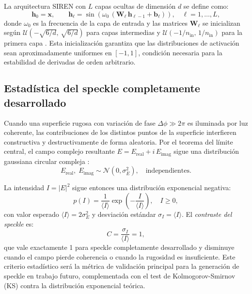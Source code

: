 La arquitectura SIREN con $L$ capas ocultas de dimensión $d$ se define como:
%
\begin{equation}
  \mathbf{h}_0 = \mathbf{x}, \qquad
  \mathbf{h}_\ell = \sin\!\left(\omega_0\,(\mathbf{W}_\ell\,\mathbf{h}_{\ell-1} + \mathbf{b}_\ell)\right),
  \quad \ell = 1, \ldots, L,
  \label{eq:siren}
\end{equation}
%
donde $\omega_0$ es la frecuencia de la capa de entrada y las matrices $\mathbf{W}_\ell$
se inicializan según $\mathcal{U}(-\sqrt{6/d},\,\sqrt{6/d})$ para capas intermedias
y $\mathcal{U}(-1/n_{\mathrm{in}},\,1/n_{\mathrm{in}})$ para la primera capa
\citep{Sitzmann2020_SIREN}.
Esta inicialización garantiza que las distribuciones de activación sean aproximadamente
uniformes en $[-1, 1]$, condición necesaria para la estabilidad de derivadas de orden
arbitrario.

\subsection{Estadística del speckle completamente desarrollado}
\label{subsec:speckle}

Cuando una superficie rugosa con variación de fase $\Delta\phi \gg 2\pi$ es iluminada
por luz coherente, las contribuciones de los distintos puntos de la superficie interfieren
constructiva y destructivamente de forma aleatoria.
Por el teorema del límite central, el campo complejo resultante
$E = E_{\mathrm{real}} + i\,E_{\mathrm{imag}}$ sigue una distribución gaussiana circular
compleja \citep{Goodman2007_Speckle}:
%
\begin{equation}
  E_{\mathrm{real}},\; E_{\mathrm{imag}} \sim \mathcal{N}(0, \sigma_E^2),
  \quad \text{independientes.}
  \label{eq:campo_gaussiano}
\end{equation}

La intensidad $I = |E|^2$ sigue entonces una distribución exponencial negativa:
%
\begin{equation}
  p(I) = \frac{1}{\langle I \rangle}\exp\!\left(-\frac{I}{\langle I \rangle}\right),
  \quad I \geq 0,
  \label{eq:pdf_intensidad}
\end{equation}
%
con valor esperado $\langle I \rangle = 2\sigma_E^2$ y desviación estándar
$\sigma_I = \langle I \rangle$.
El \textit{contraste del speckle} es:
%
\begin{equation}
  C = \frac{\sigma_I}{\langle I \rangle} = 1,
  \label{eq:contraste}
\end{equation}
%
que vale exactamente 1 para speckle completamente desarrollado y disminuye
cuando el campo pierde coherencia o cuando la rugosidad es insuficiente.
Este criterio estadístico será la métrica de validación principal para la
generación de speckle en trabajo futuro, complementada con el test de
Kolmogorov-Smirnov (KS) contra la distribución exponencial teórica.

